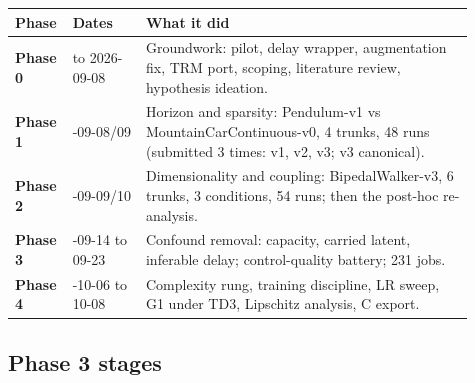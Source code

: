 \documentclass[11pt]{article}
\begin{document}
\begin{center}\small\begin{tabular}{>{\raggedright\arraybackslash}p{0.074\linewidth}>{\raggedright\arraybackslash}p{0.153\linewidth}>{\raggedright\arraybackslash}p{0.679\linewidth}}
\toprule
Phase & Dates & What it did \\
\midrule
\textbf{Phase 0} & to 2026-09-08 & Groundwork: pilot, delay wrapper, augmentation fix, TRM port, scoping, literature review, hypothesis ideation. \\
\textbf{Phase 1} & 2026-09-08/09 & Horizon and sparsity: Pendulum-v1 vs MountainCarContinuous-v0, 4 trunks, 48 runs (submitted 3 times: v1, v2, v3; v3 canonical). \\
\textbf{Phase 2} & 2026-09-09/10 & Dimensionality and coupling: BipedalWalker-v3, 6 trunks, 3 conditions, 54 runs; then the post-hoc re-analysis. \\
\textbf{Phase 3} & 2026-09-14 to 09-23 & Confound removal: capacity, carried latent, inferable delay; control-quality battery; 231 jobs. \\
\textbf{Phase 4} & 2026-10-06 to 10-08 & Complexity rung, training discipline, LR sweep, G1 under TD3, Lipschitz analysis, C export. \\
\bottomrule
\end{tabular}\end{center}



\subsection*{Phase 3 stages}
\end{document}
